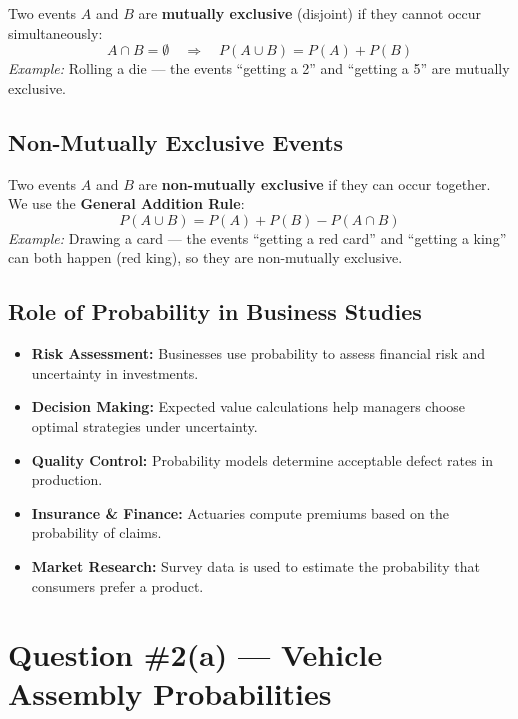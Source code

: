 \documentclass[12pt]{article}
\begin{document}
Two events $A$ and $B$ are \textbf{mutually exclusive} (disjoint) if they cannot occur simultaneously:
\[
  A \cap B = \emptyset \quad \Longrightarrow \quad P(A \cup B) = P(A) + P(B)
\]
\textit{Example:} Rolling a die --- the events ``getting a 2'' and ``getting a 5'' are mutually exclusive.

\subsection*{Non-Mutually Exclusive Events}

Two events $A$ and $B$ are \textbf{non-mutually exclusive} if they can occur together. We use the \textbf{General Addition Rule}:
\[
  P(A \cup B) = P(A) + P(B) - P(A \cap B)
\]
\textit{Example:} Drawing a card --- the events ``getting a red card'' and ``getting a king'' can both happen (red king), so they are non-mutually exclusive.

\subsection*{Role of Probability in Business Studies}

\begin{observebox}
\begin{itemize}[noitemsep]
  \item \textbf{Risk Assessment:} Businesses use probability to assess financial risk and uncertainty in investments.
  \item \textbf{Decision Making:} Expected value calculations help managers choose optimal strategies under uncertainty.
  \item \textbf{Quality Control:} Probability models determine acceptable defect rates in production.
  \item \textbf{Insurance \& Finance:} Actuaries compute premiums based on the probability of claims.
  \item \textbf{Market Research:} Survey data is used to estimate the probability that consumers prefer a product.
\end{itemize}
\end{observebox}

\newpage

\section{Question \#2(a) --- Vehicle Assembly Probabilities}
\end{document}
